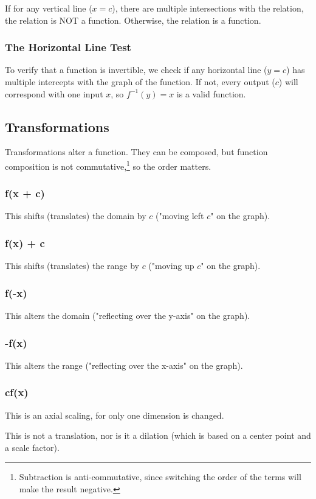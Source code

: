 \documentclass{article}
\begin{document}
If for any vertical line ($x=c$), there are multiple intersections with the relation, the relation is NOT a function. Otherwise, the relation is a function.

\subsubsection{The Horizontal Line Test}\label{horizontal-line}
To verify that a function is invertible, we check if any horizontal line ($y=c$) has multiple intercepts with the graph of the function. If not, every output ($c$) will correspond with one input $x$, so $f^{-1}(y)=x$ is a valid function.

\subsection{Transformations}
Transformations alter a function. They can be composed, but function composition is not commutative,\footnote{Subtraction is anti-commutative, since switching the order of the terms will make the result negative.} so the order matters.


\subsubsection{f(x + c)}
This shifts (translates) the domain by $c$ ("moving left $c$" on the graph).
\subsubsection{f(x) + c}
This shifts (translates) the range by $c$ ("moving up $c$" on the graph).
\subsubsection{f(-x)}
This alters the domain ("reflecting over the y-axis" on the graph).
\subsubsection{-f(x)}
This alters the range ("reflecting over the x-axis" on the graph).
\subsubsection{cf(x)}
This is an axial scaling, for only one dimension is changed.

This is not a translation, nor is it a dilation (which is based on a center point and a scale factor).
\end{document}
